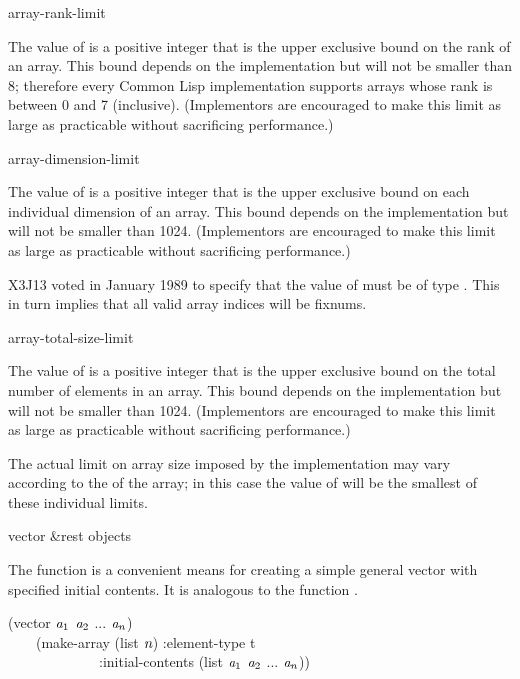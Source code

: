 \begin{defun}[Constant]
array-rank-limit

The value of  is a positive integer that is
the upper exclusive bound on the rank of an array.
This bound depends on the implementation
but will not be smaller than 8; therefore every Common Lisp implementation
supports arrays whose rank is between 0 and 7 (inclusive).
(Implementors are encouraged to make this limit as large as practicable
without sacrificing performance.)
\end{defun}

\begin{defun}[Constant]
array-dimension-limit

The value of  is a positive integer that is
the upper exclusive bound on each individual dimension of an array.
This bound depends on the implementation
but will not be smaller than 1024.
(Implementors are encouraged to make this limit as large as practicable
without sacrificing performance.)

\begin{new}
X3J13 voted in January 1989
to specify that the value
of  must be of type .
This in turn implies that all valid array indices will be fixnums.
\end{new}
\end{defun}

\begin{defun}[Constant]
array-total-size-limit

The value of  is a positive integer that is
the upper exclusive bound on the total number of elements in an array.
This bound depends on the implementation
but will not be smaller than 1024.
(Implementors are encouraged to make this limit as large as practicable
without sacrificing performance.)

The actual limit on array size imposed by the implementation may vary
according to the  of the array; in this case the value of
 will be the smallest of these individual
limits.
\end{defun}

\begin{defun}[Function]
vector &rest objects

The function  is a convenient means for creating
a simple general vector with specified initial contents.
It is analogous to the function .
\begin{lisp}
(vector $\emph{a}_1$ $\emph{a}_2$ ... $\emph{a}_{n}$) \\
~~~\EQ\ (make-array (list $\emph{n}$) :element-type t \\
~~~~~~~~~~~~~:initial-contents (list $\emph{a}_1$ $\emph{a}_2$ ... $\emph{a}_{n}$))
\end{lisp}
\end{defun}

